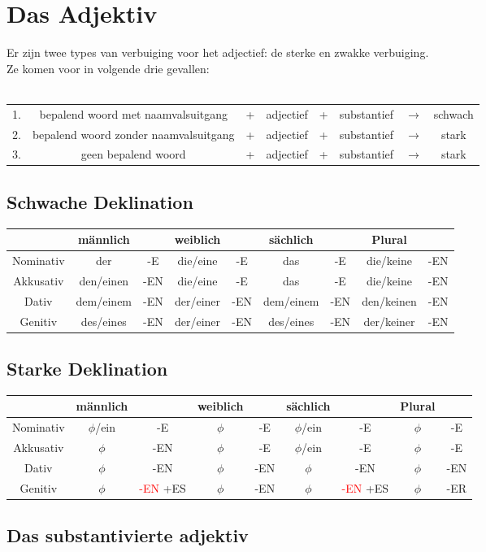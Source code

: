 \documentclass[main.tex]{subfiles}
\begin{document}
\chapter{Das Adjektiv}
Er zijn twee types van verbuiging voor het adjectief: de sterke en zwakke verbuiging.\\
Ze komen voor in volgende drie gevallen:
\\
\\
\bgroup
\def\arraystretch{1.5}
\begin{tabular}{cccccccc}
1. & bepalend woord met naamvalsuitgang & + & adjectief & + & substantief & $\rightarrow$ & schwach \\ 

2. & bepalend woord zonder naamvalsuitgang & + & adjectief & + & substantief & $\rightarrow$ & stark \\

3. & geen bepalend woord & + & adjectief & + & substantief & $\rightarrow$ & stark \\ 
\end{tabular} 
\egroup

\section{Schwache Deklination}
\begin{tabular}{|c|c|c|c|c|c|c|c|c|}
\hline 
\rowcolor{gray}
  & männlich &  & weiblich &  & sächlich &  & Plural &  \\ 
\hline 
\cellcolor[gray]{0.8}Nominativ & der & -E & die/eine & -E & das & -E & die/keine & -EN \\ 
\hline 
\cellcolor[gray]{0.8}Akkusativ & den/einen & -EN & die/eine & -E & das & -E & die/keine & -EN \\ 
\hline 
\cellcolor[gray]{0.8}Dativ & dem/einem & -EN & der/einer & -EN & dem/einem & -EN & den/keinen & -EN \\ 
\hline 
\cellcolor[gray]{0.8}Genitiv & des/eines & -EN & der/einer & -EN & des/eines & -EN & der/keiner & -EN \\ 
\hline 
\end{tabular} 
\section{Starke Deklination}
\begin{tabular}{|c|c|c|c|c|c|c|c|c|}
\hline 
\rowcolor{gray}
  & männlich &  & weiblich &  & sächlich &  & Plural &  \\ 
\hline 
\cellcolor[gray]{0.8}Nominativ & $\phi$/ein & -E & $\phi$ & -E & $\phi$/ein & -E & $\phi$ & -E \\ 
\hline 
\cellcolor[gray]{0.8}Akkusativ & $\phi$ & -EN & $\phi$ & -E & $\phi$/ein & -E & $\phi$ & -E \\ 
\hline 
\cellcolor[gray]{0.8}Dativ & $\phi$ & -EN & $\phi$ & -EN & $\phi$ & -EN & $\phi$ & -EN \\ 
\hline 
\cellcolor[gray]{0.8}Genitiv & $\phi$ & \textcolor{red}{-EN} +ES & $\phi$ & -EN & $\phi$ & \textcolor{red}{-EN} +ES & $\phi$ & -ER \\ 
\hline 
\end{tabular} 

\section{Das substantivierte adjektiv}
\end{document}
